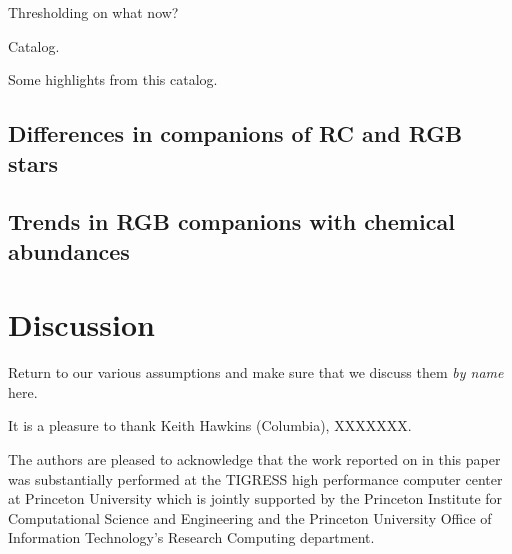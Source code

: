 \documentclass[modern, letterpaper]{aastex61}
\newcommand{\apogee}{\project{\acronym{APOGEE}}}
\newcommand{\sdssiii}{\project{\acronym{SDSS-III}}}
\begin{document}

Thresholding on what now?

Catalog.

Some highlights from this catalog.

\subsection{Differences in companions of RC and RGB stars}
\label{sec:rc-rgb}


\subsection{Trends in RGB companions with chemical abundances}
\label{sec:rgb-chemistry}


\section{Discussion}

Return to our various assumptions and make sure that we discuss them
\emph{by name} here.

\acknowledgements

It is a pleasure to thank Keith Hawkins (Columbia), XXXXXXX.

The authors are pleased to acknowledge that the work reported on in this
paper was substantially performed at the TIGRESS high performance computer
center at Princeton University which is jointly supported by the Princeton
Institute for Computational Science and Engineering and the Princeton
University Office of Information Technology's Research Computing department.


\facility{\sdssiii, \apogee}



\end{document}
